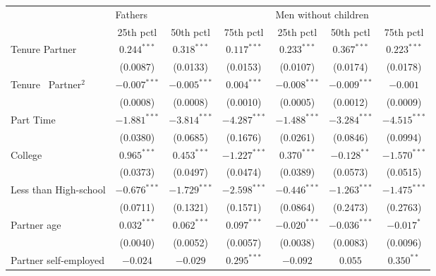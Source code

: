 \begin{tabular}{l|ccc|ccc}
\toprule
{} & \multicolumn{3}{l}{Fathers} & \multicolumn{3}{l}{Men without children} \\
{} &       25th pctl &       50th pctl &       75th pctl &            25th pctl &       50th pctl &       75th pctl \\
\midrule
Tenure Partner                &   $0.244^{***}$ &   $0.318^{***}$ &   $0.117^{***}$ &        $0.233^{***}$ &   $0.367^{***}$ &   $0.223^{***}$ \\
                              &        (0.0087) &        (0.0133) &        (0.0153) &             (0.0107) &        (0.0174) &        (0.0178) \\
Tenure \ Partner$^{2}$        &  $-0.007^{***}$ &  $-0.005^{***}$ &   $0.004^{***}$ &       $-0.008^{***}$ &  $-0.009^{***}$ &        $-0.001$ \\
                              &        (0.0008) &        (0.0008) &        (0.0010) &             (0.0005) &        (0.0012) &        (0.0009) \\
Part Time                     &  $-1.881^{***}$ &  $-3.814^{***}$ &  $-4.287^{***}$ &       $-1.488^{***}$ &  $-3.284^{***}$ &  $-4.515^{***}$ \\
                              &        (0.0380) &        (0.0685) &        (0.1676) &             (0.0261) &        (0.0846) &        (0.0994) \\
College                       &   $0.965^{***}$ &   $0.453^{***}$ &  $-1.227^{***}$ &        $0.370^{***}$ &   $-0.128^{**}$ &  $-1.570^{***}$ \\
                              &        (0.0373) &        (0.0497) &        (0.0474) &             (0.0389) &        (0.0573) &        (0.0515) \\
Less than High-school         &  $-0.676^{***}$ &  $-1.729^{***}$ &  $-2.598^{***}$ &       $-0.446^{***}$ &  $-1.263^{***}$ &  $-1.475^{***}$ \\
                              &        (0.0711) &        (0.1321) &        (0.1571) &             (0.0864) &        (0.2473) &        (0.2763) \\
Partner age                   &   $0.032^{***}$ &   $0.062^{***}$ &   $0.097^{***}$ &       $-0.020^{***}$ &  $-0.036^{***}$ &      $-0.017^*$ \\
                              &        (0.0040) &        (0.0052) &        (0.0057) &             (0.0038) &        (0.0083) &        (0.0096) \\
Partner self-employed         &        $-0.024$ &        $-0.029$ &   $0.295^{***}$ &             $-0.092$ &         $0.055$ &    $0.350^{**}$ \\

\end{tabular}
